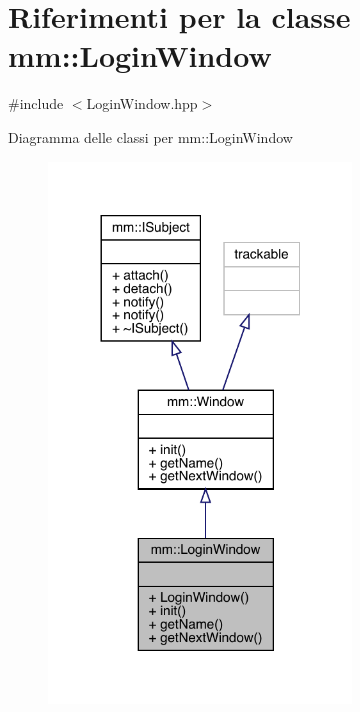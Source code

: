 \hypertarget{classmm_1_1_login_window}{}\section{Riferimenti per la classe mm\+:\+:Login\+Window}
\label{classmm_1_1_login_window}


{\ttfamily \#include $<$Login\+Window.\+hpp$>$}



Diagramma delle classi per mm\+:\+:Login\+Window
\nopagebreak
\begin{figure}[H]
\begin{center}
\leavevmode
\includegraphics[width=228pt]{da/db3/classmm_1_1_login_window__inherit__graph}
\end{center}
\end{figure}


